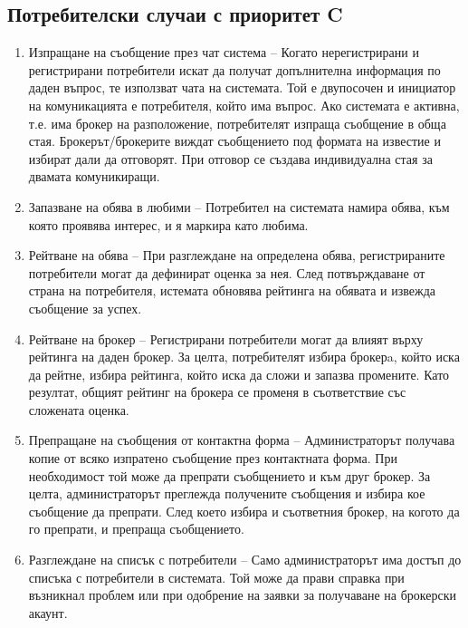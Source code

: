 \documentclass[a4paper]{article}
\begin{document}
\subsection{Потребителски случаи с приоритет C}
\begin{enumerate}
\renewcommand{\theenumi}{C-\arabic{enumi}}
\setcounter{enumi}{1}

\item {Изпращане на съобщение през чат система --
Когато нерегистрирани и регистрирани потребители искат да получат допълнителна информация по даден въпрос, те използват чата на системата. Той е двупосочен и инициатор на комуникацията е потребителя, който има въпрос. Ако системата е активна, т.е. има брокер на разположение, потребителят изпраща съобщение в обща стая. Брокерът/брокерите виждат съобщението под формата на известие и избират дали да отговорят. При отговор се създава индивидуална стая за двамата комуникиращи.
}

\item {Запазване на обява в любими -- 
		Потребител на системата намира обява, към която проявява интерес, и я маркира като любима.
}        

\item {Рейтване на обява --
    При разглеждане на определена обява, регистрираните потребители могат да дефинират оценка за нея.
    След потвърждаване от страна на потребителя, истемата обновява рейтинга на обявата и извежда съобщение за успех.
}

\item {Рейтване на брокер --
    Регистрирани потребители могат да влияят върху рейтинга на даден брокер.
    За целта, потребителят избира брокерa, който иска да рейтне, избира
    рейтинга, който иска да сложи и запазва промените. Като резултат, общият рейтинг
    на брокера се променя в съответствие със сложената оценка.
}
\item {Препращане на съобщения от контактна форма --
        Администраторът получава копие от всяко изпратено съобщение през контактната форма.
        При необходимост той може да препрати съобщението и към друг брокер.
        За целта, администраторът преглежда получените съобщения и избира кое съобщение да препрати. 
        След което избира и съответния брокер, на когото да го препрати, и препраща съобщението.
}
\item {Разглеждане на списък с потребители --
Само администраторът има достъп до списъка с потребители в системата. Той може да прави справка при възникнал проблем или при одобрение на заявки за получаване на брокерски акаунт.
}


\end{enumerate}
\end{document}
